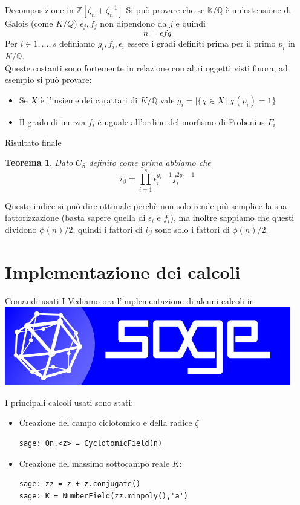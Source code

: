 \documentclass[handout]{beamer}
\theoremstyle{plain}
\newtheorem{teo}{Teorema}[section]
\theoremstyle{remark}
\theoremstyle{definition}
\newcommand{\sage}{\href{https://www.sagemath.org}{\includegraphics[height=\fontcharht\font`\B]{../images/sage.png} }}
\newcommand{\Z}{\mathbb{Z}}
\newcommand{\K}{\mathbb{K}}
\newcommand{\Q}{\mathbb{Q}}
\begin{document}
	\begin{frame}{Decomposizione in $ \Z [\zeta_n + \zeta_n^{-1}] $}
		Si può provare che se $ \K / \Q $ è un'estensione di Galois (come $ K / Q $) $ \epsilon _j, f_j $ non dipendono da $ j $ e quindi \[ n = \epsilon fg \] \pause
		Per $ i\in {1 , ... , s} $ definiamo $ g_i , f_i , \epsilon _i $ essere i gradi definiti prima per il primo $ p_i$ in $ K /\Q $.\\
		\pause
		Queste costanti sono fortemente in relazione con altri oggetti visti finora, ad esempio si può provare:
		\begin{itemize}
		\item Se $ X $ è l'insieme dei carattari di $ K / \Q $ vale $ g_i = | \{ \chi \in X \,|\, \chi(p_i)=1 \} $
		\item Il grado di inerzia $ f_i $ è uguale all'ordine del morfismo di Frobenius $ F_i $
		\end{itemize}
	\end{frame}
	
	\begin{frame}{Risultato finale}
		\begin{teo} \label{teo:idx_opt}
					Dato $ C_\beta $ definito come prima abbiamo che
					\[ i_\beta  =  \prod_{i=1}^s \epsilon _i^{g_i - 1} f_i ^{2 g_i - 1}\]
		\end{teo}
		\pause
		Questo indice si può dire ottimale perchè non solo rende più semplice la sua fattorizzazione (basta sapere quella di $ \epsilon _i $ e $ f_i $), ma inoltre sappiamo che questi dividono $ \phi(n)/2  $, quindi i fattori di $i_\beta $ sono solo i fattori di $ \phi(n)/2 $.
	\end{frame}

	\section{Implementazione dei calcoli}
	
\begin{frame}[fragile]{Comandi usati I}
Vediamo ora l'implementazione di alcuni calcoli in \sage 

I principali calcoli usati sono stati:\\ \pause

\begin{itemize}
\item Creazione del campo ciclotomico e della radice $\zeta$
\begin{lstlisting}
sage: Qn.<z> = CyclotomicField(n)
\end{lstlisting}

\item Creazione del massimo sottocampo reale $ K $:
\begin{lstlisting}
sage: zz = z + z.conjugate()
sage: K = NumberField(zz.minpoly(),'a')
\end{lstlisting}


\end{itemize}	
\end{frame}
\end{document}
